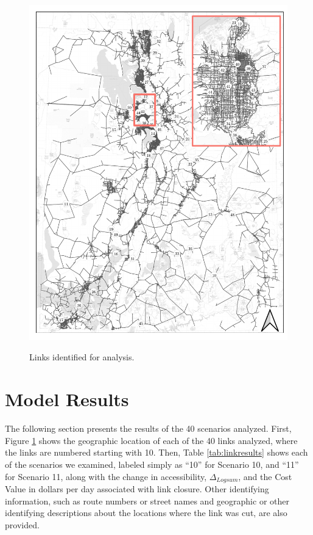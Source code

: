 \begin{figure}
\centering
{\centering \includegraphics[width=0.95\linewidth]{figures/chapter4/resiliency_links_map.pdf}}

\caption{Links identified for analysis.}
\label{fig:linksmap}
\end{figure}

\section{Model Results}

The following section presents the results of the 40 scenarios analyzed.
First, Figure \ref{fig:linksmap} shows the geographic location of each of the
40 links analyzed, where the links are numbered starting with 10. Then,
Table \ref{tab:linkresults} shows each of the scenarios we examined,
labeled simply as ``10'' for Scenario 10, and ``11'' for Scenario 11, along with the
change in accessibility, \(\Delta_{Logsum}\), and the Cost Value in dollars per day
associated with link closure. Other identifying information, such as route
numbers or street names and geographic or other identifying descriptions about
the locations where the link was cut, are also provided.

